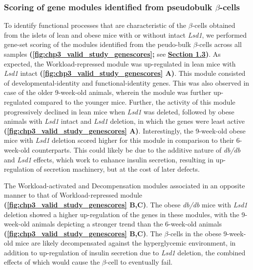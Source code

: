 \subsubsection{\large Scoring of gene modules identified from pseudobulk $\beta$-cells}

\par To identify functional processes that are characteristic of the $\beta$-cells obtained from the islets of lean and obese mice with or without intact \textit{Lsd1}, we performed gene-set scoring of the modules identified from the peudo-bulk $\beta$-cells across all samples \textbf{(\autoref{fig:chp3_valid_study_genescores};} see \textbf{\hyperref[sec:chp3_pseudobulk]{Section 1.3})}. As expected, the Workload-repressed module was up-regulated in lean mice with \textit{Lsd1} intact \textbf{(\autoref{fig:chp3_valid_study_genescores} A)}. This module consisted of developmental-identity and functional-identity genes. This was also observed in case of the older 9-week-old animals, wherein the module was further up-regulated compared to the younger mice. Further, the activity of this module progressively declined in lean mice when \textit{Lsd1} was deleted, followed by obese animals with \textit{Lsd1} intact and \textit{Lsd1} deletion, in which the genes were least active \textbf{(\autoref{fig:chp3_valid_study_genescores} A)}. Interestingly, the 9-week-old obese mice with \textit{Lsd1} deletion scored higher for this module in comparison to their 6-week-old counterparts. This could likely be due to the additive nature of \textit{db/db} and \textit{Lsd1} effects, which work to enhance insulin secretion, resulting in up-regulation of secretion machinery, but at the cost of later defects.\\

\par The Workload-activated and Decompensation modules associated in an opposite manner to that of Workload-repressed module \textbf{(\autoref{fig:chp3_valid_study_genescores} B,C)}. The obese \textit{db/db} mice with \textit{Lsd1} deletion showed a higher up-regulation of the genes in these modules, with the 9-week-old animals depicting a stronger trend than the 6-week-old animals \textbf{(\autoref{fig:chp3_valid_study_genescores} B,C)}. The $\beta$-cells in the obese 9-week-old mice are likely decompensated against the hyperglycemic environment, in addition to up-regulation of insulin secretion due to \textit{Lsd1} deletion, the combined effects of which would cause the $\beta$-cell to eventually fail.



